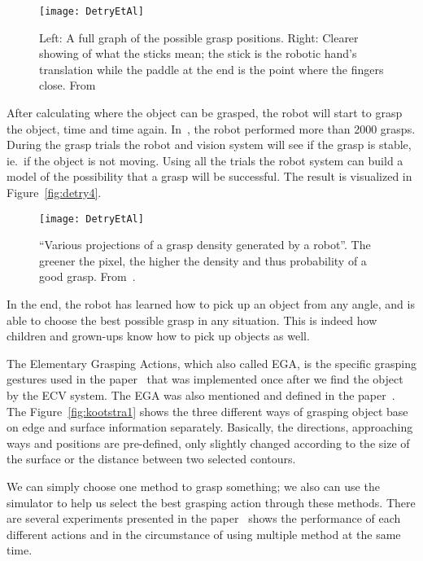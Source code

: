 \begin{figure}
	\centering
	\texttt{[image: DetryEtAl]}
	\caption{Left: A full graph of the possible grasp positions.
		Right: Clearer showing of what the sticks mean;
		the stick is the robotic hand's translation while the paddle at the end is the point where the fingers close. From~\cite{detry}}
	\label{fig:detry11}
\end{figure}

After calculating where the object can be grasped, the robot will start to grasp the object, time and time again. 
In~\cite{detry}, the robot performed more than 2000 grasps.
During the grasp trials the robot and vision system will see if the grasp is stable, ie.\ if the object is not moving. 
Using all the trials the robot system can build a model of the possibility that a grasp will be successful. 
The result is visualized in Figure~\vref{fig:detry4}.

\begin{figure}
	\centering
	\texttt{[image: DetryEtAl]}
	\caption{``Various projections of a grasp density generated by a robot''. The greener the pixel, the higher the density and thus probability of a good grasp. From~\cite{detry}.}
\label{fig:detry4}
\end{figure}

In the end, the robot has learned how to pick up an object from any angle,
and is able to choose the best possible grasp in any situation.
This is indeed how children and grown-ups know how to pick up objects as well.

The Elementary Grasping Actions, which also called EGA, is the specific grasping gestures used in the paper~\cite{kootstra} that was implemented once after we find the object by the ECV system. 
The EGA was also mentioned and defined in the paper~\cite{pugeault}. 
The Figure~\vref{fig:kootstra1} shows the three different ways of grasping object base on edge and surface information separately. 
Basically, the directions, approaching ways and positions are pre-defined, only slightly changed according to the size of the surface or the distance between two selected contours. 

We can simply choose one method to grasp something; we also can use the simulator to help us select the best grasping action through these methods. There are several experiments presented in the paper~\cite{kootstra} shows the performance of each different actions and in the circumstance of using multiple method at the same time. 

